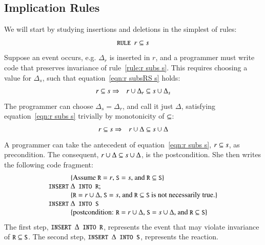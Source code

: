 \documentclass{elsarticle}
\begin{document}
\subsection{Implication Rules}
\label{ssct:Implication Rules}
	We will start by studying insertions and deletions in the simplest of rules:
\begin{equation}
\text{\tt\small RULE }r\subseteq s\label{rule:r subs s}
\end{equation}
	Suppose an event occurs, e.g. $\Delta_r$ is inserted in $r$,
	and a programmer must write code that preserves invariance of rule~\ref{rule:r subs s}.
	This requires choosing a value for $\Delta_s$, such that equation~\ref{eqn:r subsRS s} holds:
\begin{eqnarray}
r\subseteq s&\Rightarrow&r\cup\Delta_r\subseteq s\cup \Delta_s\label{eqn:r subsRS s}
\end{eqnarray}
	The programmer can choose $\Delta_s=\Delta_r$, and call it just $\Delta$,
	satisfying equation~\ref{eqn:r subs s} trivially by monotonicity of $\subseteq$:
\begin{eqnarray}
r\subseteq s&\Rightarrow&r\cup\Delta\subseteq s\cup \Delta\label{eqn:r subs s}
\end{eqnarray}
	A programmer can take the antecedent of equation~\ref{eqn:r subs s}, $r\subseteq s$, as precondition.
	The consequent, $r\cup\Delta\subseteq s\cup \Delta$, is the postcondition.
	She then writes the following code fragment:
\[\begin{array}{r@{~}l}
&\{\text{Assume $\code{R}=r$, $\code{S}=s$, and $\code{R}\subs\code{S}$}\}\\
\code{INSERT}&\Delta\code{ INTO R};\\
&\{\text{$\code{R}=r\cup\Delta$, $\code{S}=s$, and $\code{R}\subs\code{S}$ is not necessarily true.}\}\\
\code{INSERT}&\Delta\code{ INTO S}\\
&\{\text{postcondition: $\code{R}=r\cup\Delta$, $\code{S}=s\cup\Delta$, and $\code{R}\subs\code{S}$}\}
\end{array}\]
	The first step, $\code{INSERT }\Delta\code{ INTO R}$, represents the event that may violate invariance of $\text{\tt\small R}\subseteq\text{\tt\small S}$.
	The second step, $\code{INSERT }\Delta\code{ INTO S}$, represents the reaction.
\end{document}

